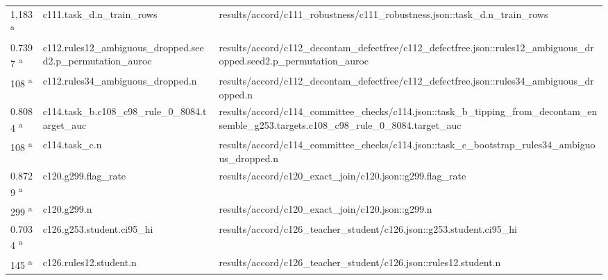 \begin{longtable}{@{}p{0.7in}p{1.9in}p{2.6in}@{}}
1,183 \textsuperscript{a} & c111.\allowbreak{}task\_d.\allowbreak{}n\_train\_rows & results/\allowbreak{}accord/\allowbreak{}c111\_robustness/\allowbreak{}c111\_robustness.\allowbreak{}json::task\_d.\allowbreak{}n\_train\_rows\\
0.7397 \textsuperscript{a} & c112.\allowbreak{}rules12\_ambiguous\_dropped.\allowbreak{}seed2.\allowbreak{}p\_permutation\_auroc & results/\allowbreak{}accord/\allowbreak{}c112\_decontam\_defectfree/\allowbreak{}c112\_defectfree.\allowbreak{}json::rules12\_ambiguous\_dropped.\allowbreak{}seed2.\allowbreak{}p\_permutation\_auroc\\
108 \textsuperscript{a} & c112.\allowbreak{}rules34\_ambiguous\_dropped.\allowbreak{}n & results/\allowbreak{}accord/\allowbreak{}c112\_decontam\_defectfree/\allowbreak{}c112\_defectfree.\allowbreak{}json::rules34\_ambiguous\_dropped.\allowbreak{}n\\
0.8084 \textsuperscript{a} & c114.\allowbreak{}task\_b.\allowbreak{}c108\_c98\_rule\_0\_8084.\allowbreak{}target\_auc & results/\allowbreak{}accord/\allowbreak{}c114\_committee\_checks/\allowbreak{}c114.\allowbreak{}json::task\_b\_tipping\_from\_decontam\_ensemble\_g253.\allowbreak{}targets.\allowbreak{}c108\_c98\_rule\_0\_8084.\allowbreak{}target\_auc\\
108 \textsuperscript{a} & c114.\allowbreak{}task\_c.\allowbreak{}n & results/\allowbreak{}accord/\allowbreak{}c114\_committee\_checks/\allowbreak{}c114.\allowbreak{}json::task\_c\_bootstrap\_rules34\_ambiguous\_dropped.\allowbreak{}n\\
0.8729 \textsuperscript{a} & c120.\allowbreak{}g299.\allowbreak{}flag\_rate & results/\allowbreak{}accord/\allowbreak{}c120\_exact\_join/\allowbreak{}c120.\allowbreak{}json::g299.\allowbreak{}flag\_rate\\
299 \textsuperscript{a} & c120.\allowbreak{}g299.\allowbreak{}n & results/\allowbreak{}accord/\allowbreak{}c120\_exact\_join/\allowbreak{}c120.\allowbreak{}json::g299.\allowbreak{}n\\
0.7034 \textsuperscript{a} & c126.\allowbreak{}g253.\allowbreak{}student.\allowbreak{}ci95\_hi & results/\allowbreak{}accord/\allowbreak{}c126\_teacher\_student/\allowbreak{}c126.\allowbreak{}json::g253.\allowbreak{}student.\allowbreak{}ci95\_hi\\
145 \textsuperscript{a} & c126.\allowbreak{}rules12.\allowbreak{}student.\allowbreak{}n & results/\allowbreak{}accord/\allowbreak{}c126\_teacher\_student/\allowbreak{}c126.\allowbreak{}json::rules12.\allowbreak{}student.\allowbreak{}n\\

\end{longtable}
